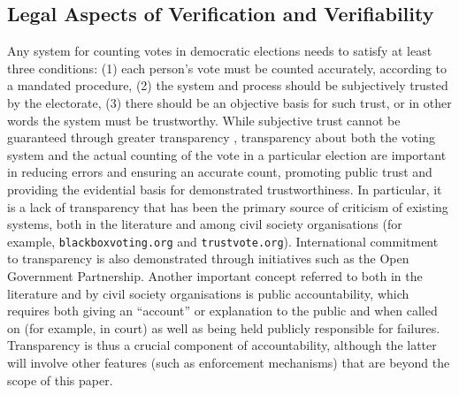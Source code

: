 	


   
   
\subsection{Legal Aspects of Verification and Verifiability}
Any system for counting votes in democratic elections needs to
satisfy at least three conditions: (1) each person's vote must be
counted accurately, according to a mandated procedure, (2) the
system and process should be subjectively trusted by the electorate,
(3) there should be an objective basis for such trust, or in other
words the system must be trustworthy. While subjective trust cannot
be guaranteed through greater transparency \cite{ONeill:2002:QT}, transparency about
both the voting system and the actual counting of the vote in a
particular election are important in reducing errors and ensuring an
accurate count, promoting public trust and providing the evidential
basis for demonstrated trustworthiness. In particular, it is a lack
of transparency that has been the primary source of criticism of
existing systems, both in the literature
\cite{Carrier:2012:VCT,Conway:2017:ANS} and among civil
society organisations \cite{Vogl:2012:WWC} (for example,
\texttt{blackboxvoting.org} and
\texttt{trustvote.org}). International commitment to transparency is also
demonstrated through initiatives such as the Open Government
Partnership. Another important concept referred to both in the
literature and by civil society organisations is public
accountability, which requires both giving an “account” or
explanation to the public and when called on (for example, in court)
as well as being held publicly responsible for failures.
Transparency is thus a crucial component of accountability, although
the latter will involve other features (such as enforcement
mechanisms) that are beyond the scope of this paper. 

